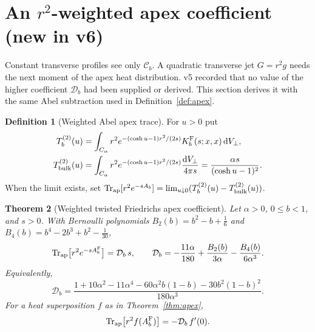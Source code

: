\documentclass[11pt,a4paper]{article}
\newcommand{\dd}{\mathrm d}
\newcommand{\Fr}{\mathrm F}
\newcommand{\Ccb}{\mathcal C}
\newcommand{\ApTr}{\operatorname{Tr}_{\rm ap}}
\theoremstyle{plain}
\newtheorem{theorem}{Theorem}[section]
\theoremstyle{definition}
\newtheorem{definition}[theorem]{Definition}
\theoremstyle{remark}
\numberwithin{equation}{section}
\begin{document}
\section{An \texorpdfstring{\(r^2\)}{r\textasciicircum 2}-weighted apex coefficient (new in v6)}
\label{sec:weighted}

Constant transverse profiles see only \(\Ccb_b\).
A quadratic transverse jet \(G=r^2g\) needs the next moment of the
apex heat distribution.
v5 recorded that no value of the higher coefficient \(\mathcal D_b\)
had been supplied or derived.
This section derives it with the same Abel subtraction used in
Definition~\ref{def:apex}.

\begin{definition}[Weighted Abel apex trace]
\label{def:weighted}
For \(u>0\) put
\begin{align*}
T^{(2)}_b(u)
 &=\int_{C_\alpha}r^2
 e^{-(\cosh u-1)r^2/(2s)}K_b^\Fr(s;x,x)\,\dd V_\perp,\\
T^{(2)}_{\rm bulk}(u)
 &=\int_{C_\alpha}r^2
 e^{-(\cosh u-1)r^2/(2s)}\frac{\dd V_\perp}{4\pi s}
 =\frac{\alpha s}{(\cosh u-1)^2}.
\end{align*}
When the limit exists, set
\(\ApTr[r^2e^{-sA_b}]=\lim_{u\downarrow0}
(T^{(2)}_b(u)-T^{(2)}_{\rm bulk}(u))\).
\end{definition}

\begin{theorem}[Weighted twisted Friedrichs apex coefficient]
\label{thm:weighted}
Let \(\alpha>0\), \(0\le b<1\), and \(s>0\).
With Bernoulli polynomials \(B_2(b)=b^2-b+\tfrac16\) and
\(B_4(b)=b^4-2b^3+b^2-\tfrac1{30}\),
\begin{equation}
\ApTr\bigl[r^2e^{-sA_b^\Fr}\bigr]=\mathcal D_b\,s,
\qquad
\mathcal D_b=-\frac{11\alpha}{180}
+\frac{B_2(b)}{3\alpha}-\frac{B_4(b)}{6\alpha^3}.
\label{eq:Db}
\end{equation}
Equivalently,
\begin{equation}
\mathcal D_b=
\frac{1+10\alpha^2-11\alpha^4-60\alpha^2b(1-b)-30b^2(1-b)^2}
{180\alpha^3}.
\label{eq:Dbexpanded}
\end{equation}
For a heat superposition \(f\) as in Theorem~\ref{thm:apex},
\begin{equation}
\ApTr\bigl[r^2f(A_b^\Fr)\bigr]=-\mathcal D_b\,f'(0).
\label{eq:Dfunctional}
\end{equation}
\end{theorem}
\end{document}
